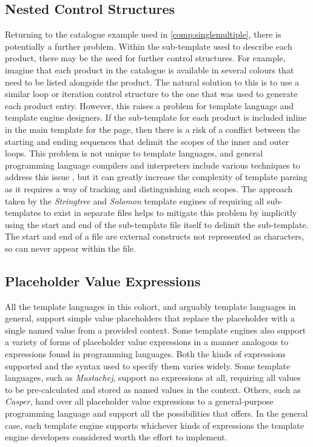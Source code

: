 \subsection{Nested Control Structures}
\label{comp:nested}

Returning to the catalogue example used in \autoref{comp:singlemultiple}, there is potentially a further problem. Within the sub-template used to describe each product, there may be the need for further control structures. For example, imagine that each product in the catalogue is available in several colours that need to be listed alongside the product. The natural solution to this is to use a similar loop or iteration control structure to the one that was used to generate each product entry. However, this raises a problem for \gls{template language} and \gls{template engine} designers. If the sub-template for each product is included inline in the main template for the page, then there is a risk of a conflict between the starting and ending sequences that delimit the scopes of the inner and outer loops. This problem is not unique to \gls{template language}s, and general \gls{programming language} compilers and interpreters include various techniques to address this issue \citep{Aho2007}, but it can greatly increase the complexity of template parsing as it requires a way of tracking and distinguishing such scopes. The approach taken by the \emph{Stringtree} and \emph{Solomon} \gls{template engine}s of requiring all sub-templates to exist in separate files helps to mitigate this problem by implicitly using the start and end of the sub-template file itself to delimit the sub-template. The start and end of a file are external constructs not represented as characters, so can never appear within the file.

\subsection{Placeholder Value Expressions}
\label{comp:expressions}

All the \gls{template language}s in this cohort, and arguably \gls{template language}s in general, support simple value placeholders that replace the placeholder with a single named value from a provided context. Some \gls{template engine}s also support a variety of forms of placeholder value expressions in a manner analogous to expressions found in \gls{programming language}s. Both the kinds of expressions supported and the syntax used to specify them varies widely. Some \gls{template language}s, such as \emph{Mustachej}, support no expressions at all, requiring all values to be pre-calculated and stored as named values in the context. Others, such as \emph{Casper}, hand over all placeholder value expressions to a general-purpose \gls{programming language} and support all the possibilities that offers. In the general case, each \gls{template engine} supports whichever kinds of expressions the \gls{template engine} developers considered worth the effort to implement.

